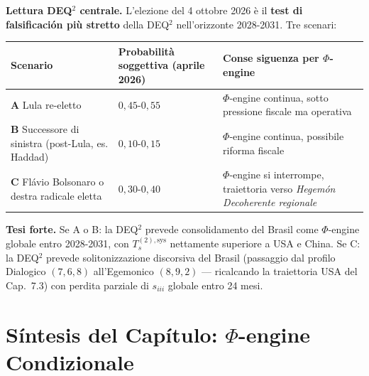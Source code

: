 \Conj{} \textbf{Lettura DEQ$^2$ centrale.} L'elezione del 4 ottobre 2026 è
il \textbf{test di falsificación più stretto} della DEQ$^2$ nell'orizzonte
2028-2031. Tre scenari:

{\def\LTcaptype{none} %
{\small\begin{longtable}[]{@{}
  >{\raggedright\arraybackslash}p{}
  >{\raggedright\arraybackslash}p{}
  >{\raggedright\arraybackslash}p{}@{}}
\toprule\noalign{}
\begin{minipage}[b]{\linewidth}\raggedright
Scenario
\end{minipage} & \begin{minipage}[b]{\linewidth}\raggedright
Probabilità soggettiva (aprile 2026)
\end{minipage} & \begin{minipage}[b]{\linewidth}\raggedright
Conse siguenza per \(\Phi\)-engine
\end{minipage} \\
\midrule\noalign{}
\endhead
\bottomrule\noalign{}
\endlastfoot
\textbf{A} Lula re-eletto & \(0{,}45\)-\(0{,}55\) & \(\Phi\)-engine
continua, sotto pressione fiscale ma operativa \\
\textbf{B} Successore di sinistra (post-Lula, es. Haddad) &
\(0{,}10\)-\(0{,}15\) & \(\Phi\)-engine continua, possibile riforma
fiscale \\
\textbf{C} Flávio Bolsonaro o destra radicale eletta &
\(0{,}30\)-\(0{,}40\) & \(\Phi\)-engine si interrompe, traiettoria verso
\emph{Hegemón Decoherente regionale} \\
\end{longtable}}
}

\Hypoth{} \textbf{Tesi forte.} Se A o B: la DEQ$^2$ prevede consolidamento
del Brasil come \(\Phi\)-engine globale entro 2028-2031, con
\(T_s^{(2),\text{sys}}\) nettamente superiore a USA e China. Se C: la
DEQ$^2$ prevede solitonizzazione discorsiva del Brasil (passaggio dal
profilo Dialogico \((7,6,8)\) all'Egemonico \((8,9,2)\) --- ricalcando
la traiettoria USA del Cap.~7.3) con perdita parziale di \(s_{iii}\)
globale entro 24 mesi.



\section{\texorpdfstring{Síntesis del Capítulo: \(\Phi\)-engine
Condizionale}{Síntesis del Capítulo: \textbackslash Phi-engine Condizionale}}\label{sintesi-del-capítulo-phi-engine-condicional}

